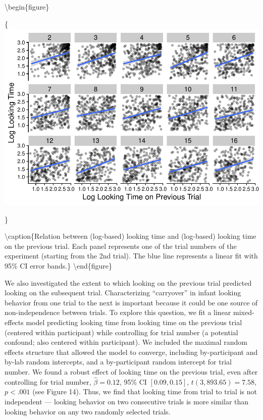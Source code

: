 \documentclass[
  english,
  man, donotrepeattitle,floatsintext]{apa6}
\begin{document}
\textbackslash begin\{figure\}

\{\centering \includegraphics{MB1T_supplement_files/figure-latex/fig14-1}

\}

\textbackslash caption\{Relation between (log-based) looking time and (log-based) looking time on the previous trial. Each panel represents one of the trial numbers of the experiment (starting from the 2nd trial). The blue line represents a linear fit with 95\% CI error bands.\}\label{fig:fig14}
\textbackslash end\{figure\}

We also investigated the extent to which looking on the previous trial predicted looking on the subsequent trial.
Characterizing ``carryover'' in infant looking behavior from one trial to the next is important because it could be one source of non-independence between trials.
To explore this question, we fit a linear mixed-effects model predicting looking time from looking time on the previous trial (centered within participant) while controlling for trial number (a potential confound; also centered within participant).
We included the maximal random effects structure that allowed the model to converge, including by-participant and by-lab random intercepts, and a by-participant random intercept for trial number.
We found a robust effect of looking time on the previous trial, even after controlling for trial number,
\(\hat{\beta} = 0.12\), 95\% CI \([0.09, 0.15]\), \(t(3,893.65) = 7.58\), \(p < .001\) (see Figure 14).
Thus, we find that looking time from trial to trial is not independent --- looking behavior on two consecutive trials is more similar than looking behavior on any two randomly selected trials.
\end{document}
